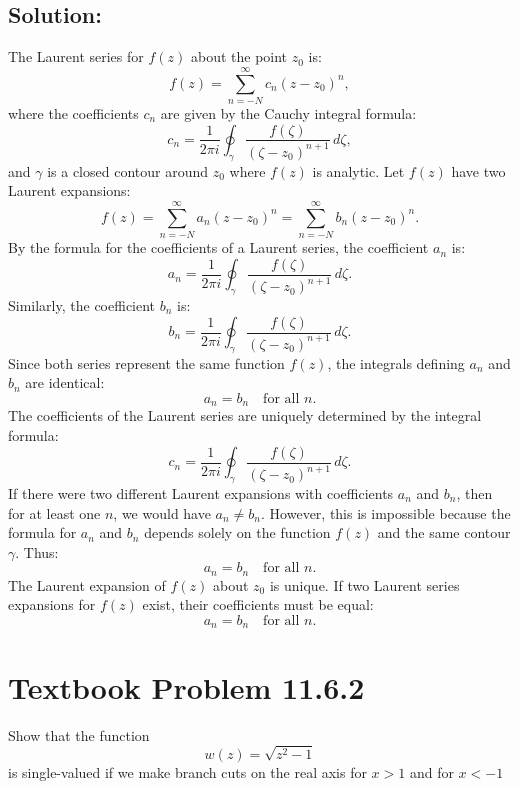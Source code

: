 \documentclass[12pt]{article}
\begin{document}
    \subsection*{Solution:}
        The Laurent series for \(f(z)\) about the point \(z_0\) is:
        \[
        f(z) = \sum_{n=-N}^\infty c_n (z - z_0)^n,
        \]
        where the coefficients \(c_n\) are given by the Cauchy integral formula:
        \[
        c_n = \frac{1}{2\pi i} \oint_\gamma \frac{f(\zeta)}{(\zeta - z_0)^{n+1}} \, d\zeta,
        \]
        and \(\gamma\) is a closed contour around \(z_0\) where \(f(z)\) is analytic.
        Let \(f(z)\) have two Laurent expansions:
        \[
        f(z) = \sum_{n=-N}^\infty a_n (z - z_0)^n = \sum_{n=-N}^\infty b_n (z - z_0)^n.
        \]
        By the formula for the coefficients of a Laurent series, the coefficient \(a_n\) is:
        \[
        a_n = \frac{1}{2\pi i} \oint_\gamma \frac{f(\zeta)}{(\zeta - z_0)^{n+1}} \, d\zeta.
        \]
        Similarly, the coefficient \(b_n\) is:
        \[
        b_n = \frac{1}{2\pi i} \oint_\gamma \frac{f(\zeta)}{(\zeta - z_0)^{n+1}} \, d\zeta.
        \]
        Since both series represent the same function \(f(z)\), the integrals defining \(a_n\) and \(b_n\) are identical:
        \[
        a_n = b_n \quad \text{for all } n.
        \]
        The coefficients of the Laurent series are uniquely determined by the integral formula:
        \[
        c_n = \frac{1}{2\pi i} \oint_\gamma \frac{f(\zeta)}{(\zeta - z_0)^{n+1}} \, d\zeta.
        \]
        If there were two different Laurent expansions with coefficients \(a_n\) and \(b_n\), then for at least one \(n\), we would have \(a_n \neq b_n\). However, this is impossible because the formula for \(a_n\) and \(b_n\) depends solely on the function \(f(z)\) and the same contour \(\gamma\). Thus:
        \[
        a_n = b_n \quad \text{for all } n.
        \]
        The Laurent expansion of \(f(z)\) about \(z_0\) is unique. If two Laurent series expansions for \(f(z)\) exist, their coefficients must be equal:
        \[
        \boxed{a_n = b_n \quad \text{for all } n.}
        \]

\section*{Textbook Problem 11.6.2}
    Show that the function
    \[
        w(z) = \sqrt{z^2 - 1}
    \]
    is single-valued if we make branch cuts on the real axis for $x>1$ and for $x<-1$
\end{document}
